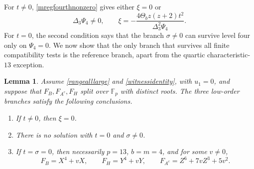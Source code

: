 \documentclass[10pt,a4paper]{amsart}
\newtheorem{lemma}{Lemma}[section]
\newcommand{\F}{\mathbb{F}_p}
\begin{document}
For $t\ne0$, \eqref{mregfourthnonzero} gives either $\xi=0$ or
\begin{equation}\label{mregxicandidate}
 \Delta_3\Psi_4\ne0,
 \qquad
 \xi=-\frac{4\Theta_bz(z+2)t^2}{\Delta_3^2\Psi_4}.
\end{equation}
For $t=0$, the second condition says that the branch $\sigma\ne0$
can survive level four only on $\Psi_4=0$.  We now show that the only
branch that survives all finite compatibility tests is the reference
branch, apart from the quartic characteristic-$13$ exception.

\begin{lemma}\label{branchscreening}
Assume \eqref{rangealllarge} and \eqref{witnessidentity}, with
$u_1=0$, and suppose that $F_B,F_{A^c},F_H$ split over $\F$ with
distinct roots.  The three low-order branches satisfy the following conclusions.
\begin{enumerate}[label=\textup{(\roman*)},nosep]
\item If $t\ne0$, then $\xi=0$.
\item There is no solution with $t=0$ and $\sigma\ne0$.
\item If $t=\sigma=0$, then necessarily $p=13$, $b=m=4$, and for some
$v\ne0$,
\begin{equation}\label{quartictriple}
 F_B=X^4+vX,\qquad F_H=Y^4+vY,\qquad
 F_{A^c}=Z^6+7vZ^3+5v^2.
\end{equation}
\end{enumerate}
\end{lemma}
\end{document}
